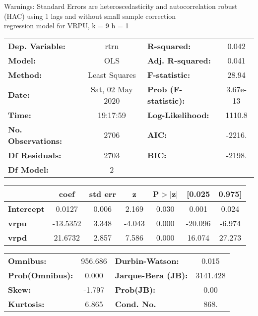 Warnings: \newline
 [1] Standard Errors are heteroscedasticity and autocorrelation robust (HAC) using 1 lags and without small sample correction\\ 

regression model for VRPU, k = 9 h = 1\begin{center}
\begin{tabular}{lclc}
\toprule
\textbf{Dep. Variable:}    &       rtrn       & \textbf{  R-squared:         } &     0.042   \\
\textbf{Model:}            &       OLS        & \textbf{  Adj. R-squared:    } &     0.041   \\
\textbf{Method:}           &  Least Squares   & \textbf{  F-statistic:       } &     28.94   \\
\textbf{Date:}             & Sat, 02 May 2020 & \textbf{  Prob (F-statistic):} &  3.67e-13   \\
\textbf{Time:}             &     19:17:59     & \textbf{  Log-Likelihood:    } &    1110.8   \\
\textbf{No. Observations:} &        2706      & \textbf{  AIC:               } &    -2216.   \\
\textbf{Df Residuals:}     &        2703      & \textbf{  BIC:               } &    -2198.   \\
\textbf{Df Model:}         &           2      & \textbf{                     } &             \\
\bottomrule
\end{tabular}
\begin{tabular}{lcccccc}
                   & \textbf{coef} & \textbf{std err} & \textbf{z} & \textbf{P$> |$z$|$} & \textbf{[0.025} & \textbf{0.975]}  \\
\midrule
\textbf{Intercept} &       0.0127  &        0.006     &     2.169  &         0.030        &        0.001    &        0.024     \\
\textbf{vrpu}      &     -13.5352  &        3.348     &    -4.043  &         0.000        &      -20.096    &       -6.974     \\
\textbf{vrpd}      &      21.6732  &        2.857     &     7.586  &         0.000        &       16.074    &       27.273     \\
\bottomrule
\end{tabular}
\begin{tabular}{lclc}
\textbf{Omnibus:}       & 956.686 & \textbf{  Durbin-Watson:     } &    0.015  \\
\textbf{Prob(Omnibus):} &   0.000 & \textbf{  Jarque-Bera (JB):  } & 3141.428  \\
\textbf{Skew:}          &  -1.797 & \textbf{  Prob(JB):          } &     0.00  \\
\textbf{Kurtosis:}      &   6.865 & \textbf{  Cond. No.          } &     868.  \\
\bottomrule
\end{tabular}
\end{center}

